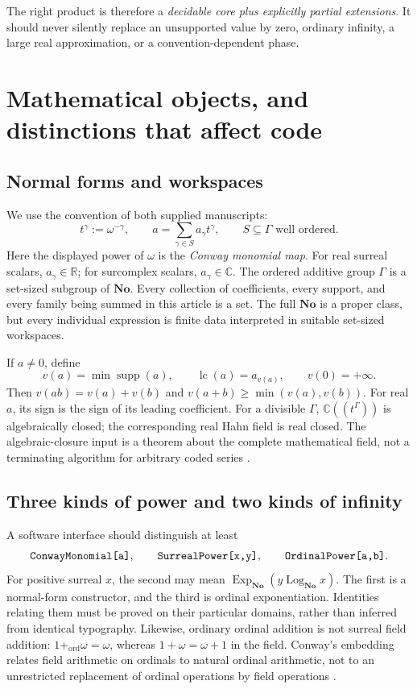 \documentclass[11pt,letterpaper]{article}
\theoremstyle{definition}
\newcommand{\No}{\mathbf{No}}
\newcommand{\R}{\mathbb R}
\newcommand{\C}{\mathbb C}
\newcommand{\supp}{\operatorname{supp}}
\newcommand{\lc}{\operatorname{lc}}
\newcommand{\ExpNo}{\operatorname{Exp}_{\No}}
\newcommand{\LogNo}{\operatorname{Log}_{\No}}
\newcommand{\code}[1]{\texttt{\detokenize{#1}}}
\numberwithin{equation}{section}
\begin{document}
The right product is therefore a \emph{decidable core plus explicitly partial extensions}. It should never silently replace an unsupported value by zero, ordinary infinity, a large real approximation, or a convention-dependent phase.

\section{Mathematical objects, and distinctions that affect code}\label{sec:semantics}
\subsection{Normal forms and workspaces}
We use the convention of both supplied manuscripts:
\begin{equation}\label{eq:normal}
 t^\gamma:=\omega^{-\gamma},\qquad
 a=\sum_{\gamma\in S}a_\gamma t^\gamma,
 \qquad S\subseteq\Gamma\text{ well ordered}.
\end{equation}
Here the displayed power of $\omega$ is the \emph{Conway monomial map}. For real surreal scalars, $a_\gamma\in\R$; for surcomplex scalars, $a_\gamma\in\C$. The ordered additive group $\Gamma$ is a set-sized subgroup of $\No$. Every collection of coefficients, every support, and every family being summed in this article is a set. The full $\No$ is a proper class, but every individual expression is finite data interpreted in suitable set-sized workspaces.

If $a\ne0$, define
\[
 v(a)=\min\supp(a),\qquad \lc(a)=a_{v(a)},\qquad v(0)=+\infty.
\]
Then $v(ab)=v(a)+v(b)$ and $v(a+b)\ge\min(v(a),v(b))$. For real $a$, its sign is the sign of its leading coefficient. For a divisible $\Gamma$, $\C((t^\Gamma))$ is algebraically closed; the corresponding real Hahn field is real closed. The algebraic-closure input is a theorem about the complete mathematical field, not a terminating algorithm for arbitrary coded series \cite[Corollary 4]{Poonen}.

\subsection{Three kinds of power and two kinds of infinity}
A software interface should distinguish at least
\[
 \code{ConwayMonomial[a]},\qquad
 \code{SurrealPower[x,y]},\qquad
 \code{OrdinalPower[a,b]}.
\]
For positive surreal $x$, the second may mean $\ExpNo(y\LogNo x)$. The first is a normal-form constructor, and the third is ordinal exponentiation. Identities relating them must be proved on their particular domains, rather than inferred from identical typography. Likewise, ordinary ordinal addition is not surreal field addition: $1+_{\mathrm{ord}}\omega=\omega$, whereas $1+\omega=\omega+1$ in the field. Conway's embedding relates field arithmetic on ordinals to natural ordinal arithmetic, not to an unrestricted replacement of ordinal operations by field operations \cite{Conway}.
\end{document}
